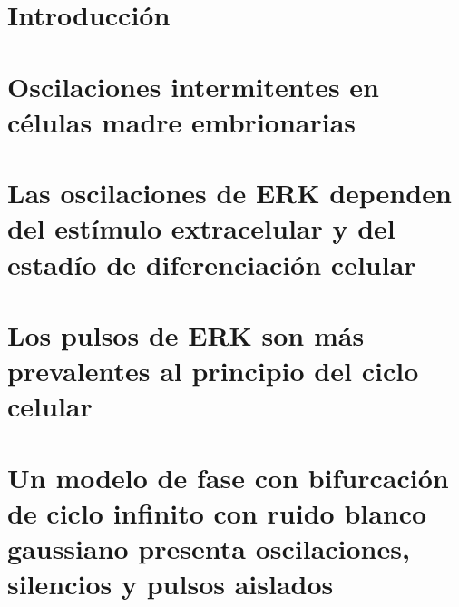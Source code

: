 \documentclass[graybox,envcountchap,sectrefs]{svmono}
\begin{document}
\frontmatter%



%
%


\tableofcontents



\mainmatter%

\chapter{Introducción}
\label{ch1}


\chapter{Oscilaciones intermitentes en células madre embrionarias}
\label{ch2}


\chapter{Las oscilaciones de ERK dependen del estímulo extracelular y del estadío de diferenciación celular}
\label{ch3}


\chapter{Los pulsos de ERK son más prevalentes al principio del ciclo celular}
\label{ch4}


\chapter{Un modelo de fase con bifurcación de ciclo infinito con ruido blanco gaussiano presenta oscilaciones, silencios y pulsos aislados}
\label{ch5}

\end{document}
